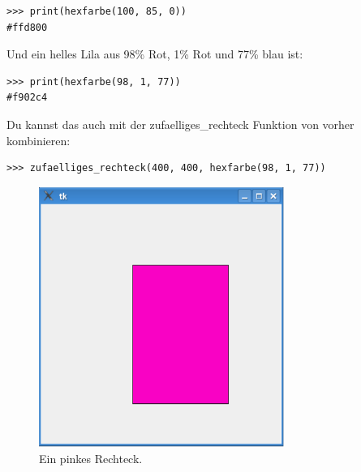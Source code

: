 \begin{Verbatim}[frame=single]
>>> print(hexfarbe(100, 85, 0))
#ffd800
\end{Verbatim}

\noindent
Und ein helles Lila aus 98\% Rot, 1\% Rot und 77\% blau ist:

\begin{Verbatim}[frame=single]
>>> print(hexfarbe(98, 1, 77))
#f902c4
\end{Verbatim}

\noindent
Du kannst das auch mit der zufaelliges\_rechteck Funktion von vorher kombinieren:

\begin{Verbatim}[frame=single]
>>> zufaelliges_rechteck(400, 400, hexfarbe(98, 1, 77))
\end{Verbatim}

\begin{figure}
\begin{center}
\includegraphics[width=80mm]{images/figure35}
\end{center}
\caption{Ein pinkes Rechteck.}\label{fig35}
\end{figure}

